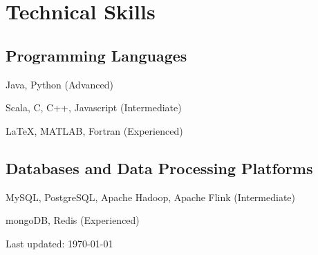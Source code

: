 \documentclass[11pt,a4paper]{article}
\renewenvironment{itemize}{
  \begin{list}{}{
    \setlength{\leftmargin}{1.5em}
    \setlength{\itemsep}{0.5em}
    \setlength{\parskip}{0pt}
    \setlength{\parsep}{0.25em}
  }
}{
  \end{list}
}
\begin{document}
\section*{Technical Skills}
\subsection*{Programming Languages}
\begin{itemize}
  \setlength{\itemsep}{0.25em}
  \item Java, Python (Advanced)
  \item Scala, C, C++, Javascript (Intermediate)
  \item \LaTeX, MATLAB, Fortran (Experienced)
\end{itemize}
\subsection*{Databases and Data Processing Platforms}
\begin{itemize}
  \setlength{\itemsep}{0.25em}
  \item MySQL, PostgreSQL, Apache Hadoop, Apache Flink (Intermediate)
  \item mongoDB, Redis (Experienced)
\end{itemize}

\bigskip
{\small Last updated: \today}
\end{document}
